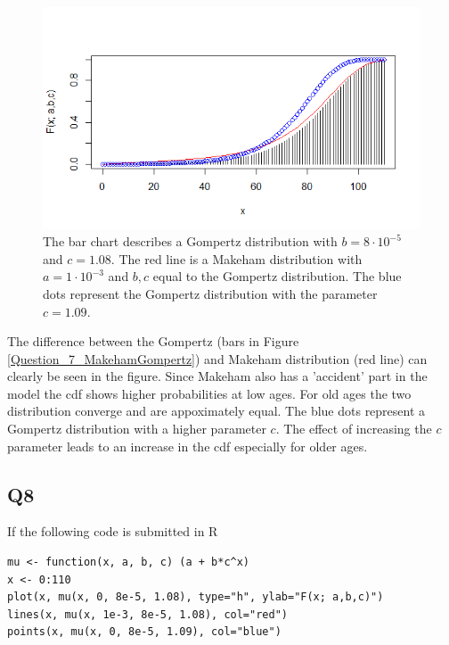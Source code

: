 \begin{center}
\begin{figure}[H]

\includegraphics[scale=1]{Question_7_MakehamGompertz.png}

\caption{The bar chart describes a Gompertz distribution with $b = 8 \cdot 10^{-5}$ and $c=1.08$. The red line is a Makeham distribution with $a=1\cdot 10^{-3}$ and $b, c$ equal to the Gompertz distribution. The blue dots represent the Gompertz distribution with the parameter $c = 1.09$.}
\label{Figure_Question7}

\end{figure}
\end{center}

The difference between the Gompertz (bars in Figure \ref{Question_7_MakehamGompertz}) and Makeham distribution (red line) can clearly be seen in the figure. Since Makeham also has a 'accident' part in the model the cdf shows higher probabilities at low ages. For old ages the two distribution converge and are appoximately equal. The blue dots represent a Gompertz distribution with a higher parameter $c$. The effect of increasing the $c$ parameter leads to an increase in the cdf especially for older ages.


\subsection*{Q8}

If the following code is submitted in R

\begin{verbatim}
mu <- function(x, a, b, c) (a + b*c^x)
x <- 0:110
plot(x, mu(x, 0, 8e-5, 1.08), type="h", ylab="F(x; a,b,c)")
lines(x, mu(x, 1e-3, 8e-5, 1.08), col="red")
points(x, mu(x, 0, 8e-5, 1.09), col="blue")
\end{verbatim}

